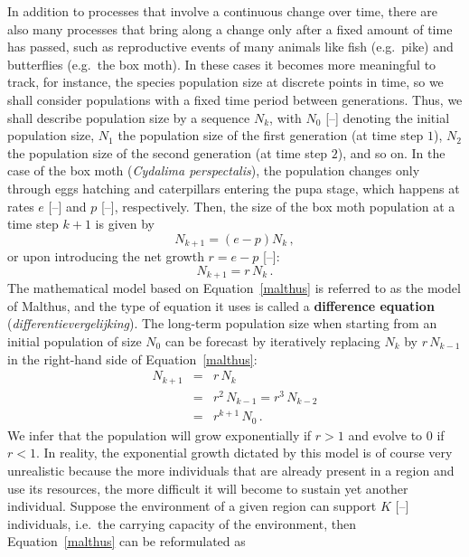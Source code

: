 In addition to processes that involve a continuous change over time, there are also many processes that bring along a change only after a fixed amount of time has passed, such as reproductive events of many animals like fish (e.g.\ pike) and butterflies (e.g.\ the box moth). In these cases it becomes more meaningful to track, for instance, the species population size at discrete points in time, so we shall consider populations with a fixed time period between generations. Thus, we shall describe population size by a sequence ${N_k}$, with $N_0$ [--] denoting the initial population size, $N_1$ the population size of the first generation (at time step $1$), $N_2$ the population size of the second generation (at time step $2$), and so on. In the case of the box moth (\textit{Cydalima perspectalis}), the population changes only through eggs hatching and caterpillars entering the pupa stage, which happens at rates $e$ [--] and $p$ [--], respectively. Then, the size of the box moth population at a time step $k+1$ is given by
\begin{equation}
	N_{k+1}=\left(e-p\right)N_k\,,
\end{equation}
or upon introducing the net growth $r=e-p$ [--]:
\begin{equation}
	N_{k+1}=r\,N_k\,.
	\label{malthus}
\end{equation}
The mathematical model based on Equation~\eqref{malthus} is referred to as the model of Malthus, and the type of equation it uses is called a \textbf{difference equation} (\textit{differentievergelijking}). 
The long-term population size when starting from an initial population of size $N_0$ can be forecast by iteratively replacing $N_k$ by $r\,N_{k-1}$ in the right-hand side of Equation~\eqref{malthus}:
\begin{eqnarray*}
N_{k+1}&=&r\,N_k\\
&=&r^2\,N_{k-1}=r^3\,N_{k-2}\\
&=&r^{k+1}\,N_0\,.
\end{eqnarray*}
We infer that the population will grow exponentially if $r>1$ and evolve to 0 if $r<1$. In reality, the exponential growth dictated by this model is of course very unrealistic because the more individuals that are already present in a region and use its resources, the more difficult it will become to sustain yet another individual. Suppose the environment of a given region can support $K$ [--] individuals, i.e.\ the carrying capacity of the environment, then  Equation~\eqref{malthus} can be reformulated as
